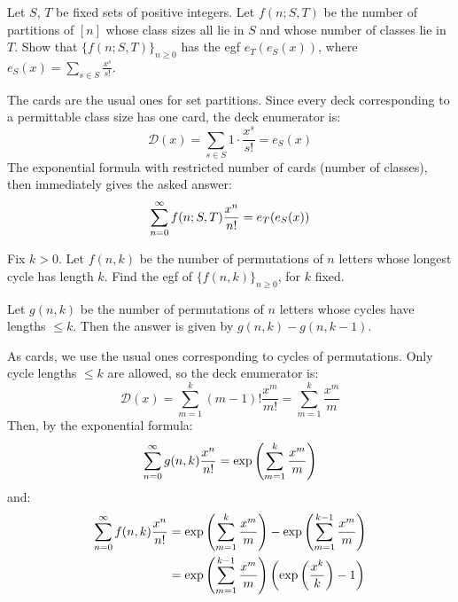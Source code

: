 \begin{exercise}
    Let $S$, $T$ be fixed sets of positive integers. Let $f(n;S,T)$ be the number of partitions of $[n]$ whose class sizes all lie in $S$ and whose number of classes lie in $T$. Show that $\{f(n;S,T)\}_{n\geq0}$ has the egf $e_T(e_S(x))$, where $e_S(x) = \sum_{s\in S} \frac{x^s}{s!}$.
\end{exercise}
\begin{solution}
    The cards are the usual ones for set partitions. Since every deck corresponding to a permittable class size has one card, the deck enumerator is:
    \[
        \mathcal{D}(x) = \sum_{s\in S} 1 \cdot \frac{x^s}{s!} = e_S(x)
    \]
    The exponential formula with restricted number of cards (number of classes), then immediately gives the asked answer:
    \[
        \sum_{n=0}^\infty f(n;S,T) \frac{x^n}{n!} = e_T(e_S(x))
    \]
\end{solution}

\begin{exercise}
    Fix $k>0$. Let $f(n,k)$ be the number of permutations of $n$ letters whose longest cycle has length $k$. Find the egf of $\{f(n,k)\}_{n\geq0}$, for $k$ fixed.
\end{exercise}
\begin{solution}
    Let $g(n,k)$ be the number of permutations of $n$ letters whose cycles have lengths $\leq k$. Then the answer is given by $g(n,k) - g(n,k-1)$.

    As cards, we use the usual ones corresponding to cycles of permutations. Only cycle lengths $\leq k$ are allowed, so the deck enumerator is:
    \[
        \mathcal{D}(x) = \sum_{m=1}^k (m-1)! \frac{x^m}{m!} = \sum_{m=1}^k \frac{x^m}{m}
    \]
    Then, by the exponential formula:
    \[
        \sum_{n=0}^\infty g(n,k) \frac{x^n}{n!} = \exp\left(\sum_{m=1}^k \frac{x^m}{m}\right)
    \]
    and:
    \begin{align*}
        \sum_{n=0}^\infty f(n,k) \frac{x^n}{n!} &= \exp\left(\sum_{m=1}^k \frac{x^m}{m}\right) - \exp\left(\sum_{m=1}^{k-1} \frac{x^m}{m}\right) \\
        &= \exp\left(\sum_{m=1}^{k-1} \frac{x^m}{m}\right) \left(\exp\left(\frac{x^k}{k}\right) - 1\right)
    \end{align*}
\end{solution}

